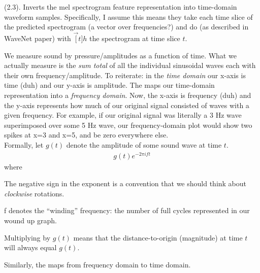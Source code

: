 \documentclass[11pt]{article}
\begin{document}
 (2.3). Inverts the mel spectrogram feature representation into time-domain waveform samples. Specifically, I assume this means they take each time slice of the predicted spectrogram (a vector over frequencies?) and do  (as described in WaveNet paper) with $\vec[t]{h}$ the spectrogram at time slice $t$. 

\begin{example}
	We measure sound by pressure/amplitudes as a function of time. What we actually measure is the \textit{sum total} of all the individual sinusoidal waves each with their own frequency/amplitude. To reiterate: in the \textit{time domain} our x-axis is time (duh) and our y-axis is amplitude. The  maps our time-domain representation into a \textit{frequency domain}. Now, the x-axis is frequency (duh) and the y-axis represents how much of our original signal consisted of waves with a given frequency. For example, if our original signal was literally a 3 Hz wave superimposed over some 5 Hz wave, our frequency-domain plot would show two spikes at x=3 and x=5, and be zero everywhere else. \\
	
	Formally, let $g(t)$ denote the amplitude of some sound wave at time $t$.
	\begin{align}
	g(t) e^{-2\pi i f t}
	\end{align}
	where 
	\begin{compactitem}
		\item The negative sign in the exponent is a convention that we should think about \textit{clockwise} rotations. 
		
		\item f denotes the ``winding'' frequency: the number of full cycles represented in our wound up graph. 
		
		\item Multiplying by $g(t)$ means that the distance-to-origin (magnitude) at time $t$ will always equal $g(t)$. 
	\end{compactitem}
	Similarly, the  maps from frequency domain to time domain.
	

\end{example}
\end{document}
